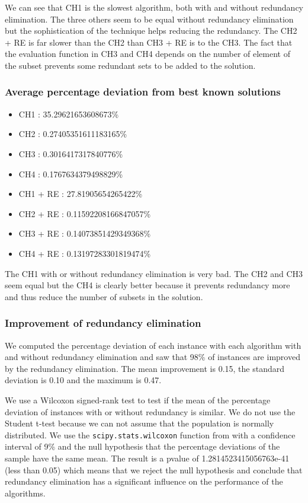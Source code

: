 \documentclass[a4paper,12pt]{article}
\begin{document}
We can see that CH1 is the slowest algorithm, both with and without redundancy elimination. The three others seem to be equal without redundancy elimination but the sophistication of the technique helps reducing the redundancy. The CH2 + RE is far slower than the CH2 than CH3 + RE is to the CH3. The fact that the evaluation function in CH3 and CH4 depends on the number of element of the subset prevents some redundant sets to be added to the solution.

\subsubsection{Average percentage deviation from best known solutions}

\begin{itemize}
    \item CH1 : 35.29621653608673\%
    \item CH2 : 0.27405351611183165\%
    \item CH3 : 0.3016417317840776\%
    \item CH4 : 0.1767634379498829\%
    \item CH1 + RE : 27.81905654265422\%
    \item CH2 + RE : 0.11592208166847057\%
    \item CH3 + RE : 0.14073851429349368\%
    \item CH4 + RE : 0.13197283301819474\%
\end{itemize}

The CH1 with or without redundancy elimination is very bad. The CH2 and CH3 seem equal but the CH4 is clearly better because it prevents redundancy more and thus reduce the number of subsets in the solution.

\subsubsection{Improvement of redundancy elimination}

We computed the percentage deviation of each instance with each algorithm with and without redundancy elimination and saw that 98\% of instances are improved by the redundancy elimination. The mean improvement is 0.15, the standard deviation is 0.10 and the maximum is 0.47.

We use a Wilcoxon signed-rank test to test if the mean of the percentage deviation of instances with or without redundancy is similar. We do not use the Student t-test because we can not assume that the population is normally distributed. We use the \texttt{scipy.stats.wilcoxon} function from \cite{scipywilcoxon} with a confidence interval of 9\% and the null hypothesis that the percentage deviations of the sample have the same mean.
The result is a pvalue of 1.2814523415056763e-41 (less than 0.05) which means that we reject the null hypothesis and conclude that redundancy elimination has a significant influence on the performance of the algorithms.
\end{document}

